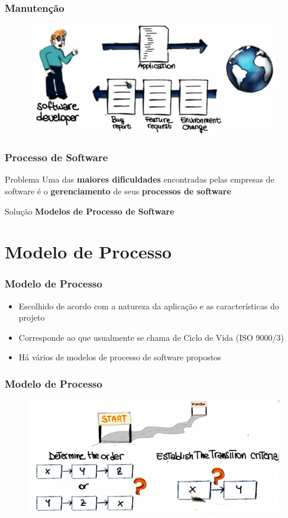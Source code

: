 \begin{frame}
 \frametitle{Manutenção}

 \begin{figure}
 \includegraphics[width =\textwidth]{figs/fig24.png}
\end{figure}
\end{frame}

\begin{frame}
 \frametitle{Processo de Software}
 \begin{block}{Problema}
 Uma das \textbf{maiores dificuldades} encontradas pelas empresas
de software é o \textbf{gerenciamento} de seus \textbf{processos de software}
 \end{block}

 \begin{block}{Solução}
  \textbf{Modelos de Processo de Software}
 \end{block}
\end{frame}

\section{Modelo de Processo}
\begin{frame}
 \frametitle{Modelo de Processo}
 \begin{itemize}
  \item Escolhido de acordo com a natureza da aplicação e as características do projeto
\item Corresponde ao que usualmente se chama de Ciclo de Vida (ISO 9000/3)
\item Há vários de modelos de processo de software propostos
 \end{itemize}
\end{frame}

\begin{frame}
 \frametitle{Modelo de Processo}
\begin{figure}
 \includegraphics[width = \textwidth]{figs/fig21.png}
\end{figure}
\end{frame}


